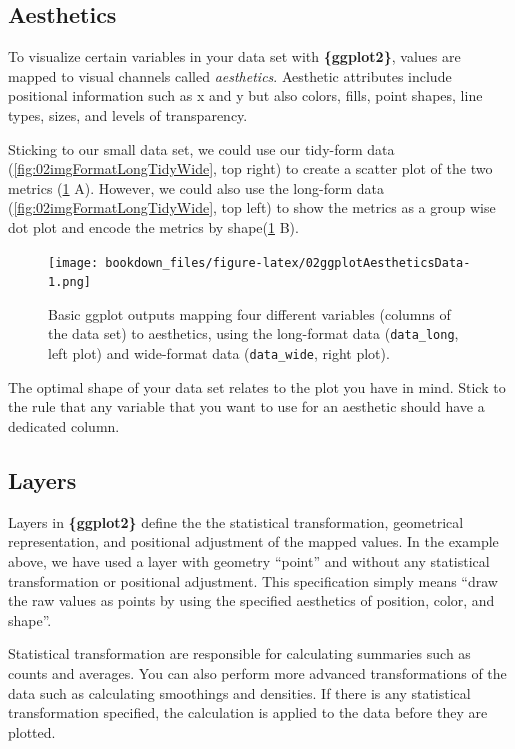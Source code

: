 \documentclass[
]{krantz}
\begin{document}
\hypertarget{aesthetics}{%
\subsection{Aesthetics}\label{aesthetics}}

To visualize certain variables in your data set with \textbf{\{ggplot2\}}, values are mapped to visual channels called \emph{aesthetics}. Aesthetic attributes include positional information such as x and y but also colors, fills, point shapes, line types, sizes, and levels of transparency.

Sticking to our small data set, we could use our tidy-form data (\ref{fig:02imgFormatLongTidyWide}, top right) to create a scatter plot of the two metrics (\ref{fig:02ggplotAestheticsData} A). However, we could also use the long-form data (\ref{fig:02imgFormatLongTidyWide}, top left) to show the metrics as a group wise dot plot and encode the metrics by shape(\ref{fig:02ggplotAestheticsData} B).

\begin{figure}
\centering
\texttt{[image: bookdown\_files/figure-latex/02ggplotAestheticsData-1.png]}
\caption{\label{fig:02ggplotAestheticsData}Basic ggplot outputs mapping four different variables (columns of the data set) to aesthetics, using the long-format data (\texttt{data\_long}, left plot) and wide-format data (\texttt{data\_wide}, right plot).}
\end{figure}

The optimal shape of your data set relates to the plot you have in mind. Stick to the rule that any variable that you want to use for an aesthetic should have a dedicated column.

\hypertarget{layers}{%
\subsection{Layers}\label{layers}}

Layers in \textbf{\{ggplot2\}} define the the statistical transformation, geometrical representation, and positional adjustment of the mapped values. In the example above, we have used a layer with geometry ``point'' and without any statistical transformation or positional adjustment. This specification simply means ``draw the raw values as points by using the specified aesthetics of position, color, and shape''.

Statistical transformation are responsible for calculating summaries such as counts and averages. You can also perform more advanced transformations of the data such as calculating smoothings and densities. If there is any statistical transformation specified, the calculation is applied to the data before they are plotted.
\end{document}
